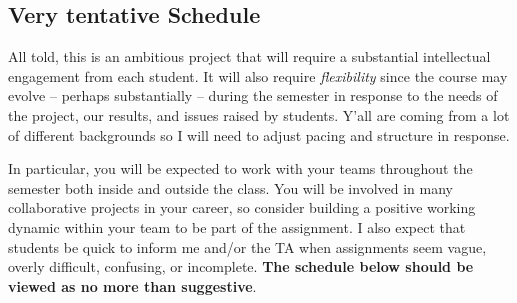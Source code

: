 \documentclass[11pt]{article}
\begin{document}
\subsection*{Very tentative Schedule}

All told, this is an ambitious project that will require a substantial
intellectual engagement from each student. It will also require
\textit{flexibility} since the course may evolve -- perhaps
substantially -- during the semester in response to the needs of the
project, our results, and issues raised by students.  Y'all are coming from a lot of different backgrounds so I will need to adjust pacing and structure in response.

In particular, you will be expected to work with your teams throughout
the semester both inside and outside the class. You will be involved
in many collaborative projects in your career, so consider building a
positive working dynamic within your team to be part of the
assignment.  I also expect that students be quick to inform me and/or
the TA when assignments seem vague, overly difficult, confusing, or
incomplete.  \textbf{The schedule below should be viewed as no more than
suggestive}.
\end{document}
